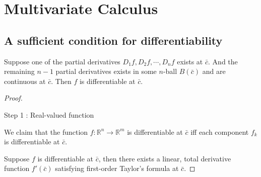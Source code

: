 \section{Multivariate Calculus}
\subsection{A sufficient condition for differentiability}
\begin{theorem}
Suppose one of the partial derivatives $D_1f,D_2f,\cdots,D_nf$ exists at $\bar{c}$.
And the remaining $n-1$ partial derivatives exists in some $n$-ball $B(\bar{c})$ and are continuous at $\bar{c}$.
Then $f$ is differentiable at $\bar{c}$.
\end{theorem}
\begin{proof}
\begin{commentary}Step 1 : Real-valued function\end{commentary}

We claim that the function $f : \mathbb{R}^n \to \mathbb{R}^m$ is differentiable at $\bar{c}$ iff each component $f_k$ is differentiable at $\bar{c}$.

Suppose $f$ is differentiable at $\bar{c}$, then there exists a linear, total derivative function $f'(\bar{c})$ satisfying first-order Taylor's formula at $\bar{c}$.


\end{proof}
